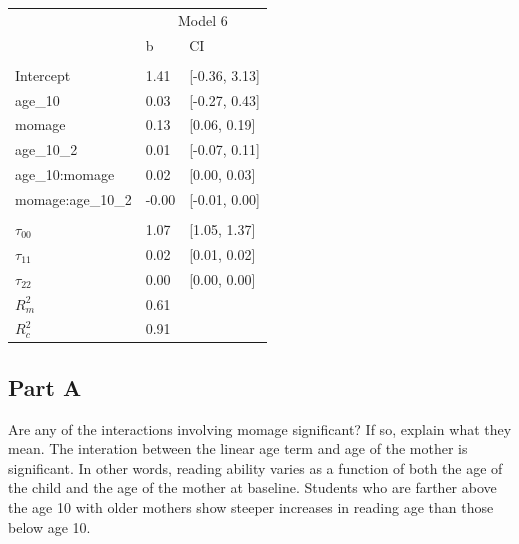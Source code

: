 \documentclass[]{article}
\begin{document}
\begin{table}[H]
\centering
\begin{tabular}{lll}
\toprule
\multicolumn{1}{c}{ } & \multicolumn{2}{c}{Model 6} \\
\cmidrule(l{2pt}r{2pt}){2-3}
 & b & CI\\
\midrule
\addlinespace[0.3em]
\multicolumn{3}{l}{\textbf{Fixed}}\\
\hspace{1em}Intercept & 1.41 & [-0.36, 3.13]\\
\hspace{1em}age\_10 & 0.03 & [-0.27, 0.43]\\
\hspace{1em}momage & 0.13 & [0.06, 0.19]\\
\hspace{1em}age\_10\_2 & 0.01 & [-0.07, 0.11]\\
\hspace{1em}age\_10:momage & 0.02 & [0.00, 0.03]\\
\hspace{1em}momage:age\_10\_2 & -0.00 & [-0.01, 0.00]\\
\addlinespace[0.3em]
\multicolumn{3}{l}{\textbf{Random}}\\
\hspace{1em}$\tau_{00}$ & 1.07 & [1.05, 1.37]\\
\hspace{1em}$\tau_{11}$ & 0.02 & [0.01, 0.02]\\
\hspace{1em}$\tau_{22}$ & 0.00 & [0.00, 0.00]\\
$R^2_m$ & 0.61 & \\
$R^2_c$ & 0.91 & \\
\bottomrule
\end{tabular}
\end{table}

\subsection{Part A}\label{part-a-3}

Are any of the interactions involving momage significant? If so, explain
what they mean. The interation between the linear age term and age of
the mother is significant. In other words, reading ability varies as a
function of both the age of the child and the age of the mother at
baseline. Students who are farther above the age 10 with older mothers
show steeper increases in reading age than those below age 10.
\end{document}

